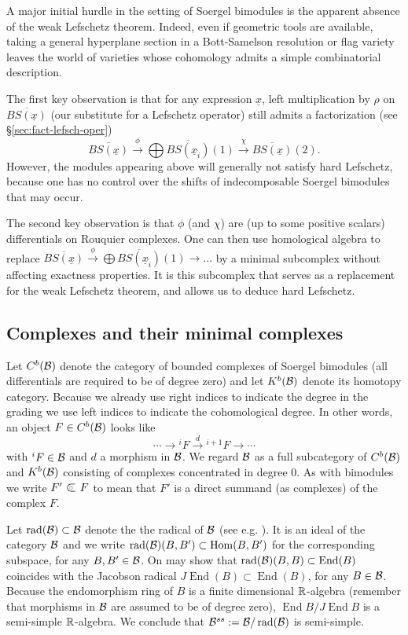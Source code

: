 \documentclass[11pt]{amsart}
\numberwithin{equation}{section}
\def\BS{{\EuScript B}}
\def\ov{\overline}
\def\un{\underline}
\def\to{\rightarrow}
\def\longto{\longrightarrow}
\def\summand{
\mathbin{\tikz [baseline=-3pt]
{
\clip (-0.2,-0.15) rectangle (0.2,0.15);
\node[scale=1.2] at (0,0) {$\subset$}; \node[scale=0.5] at
  (0,0) {$\oplus$}; }}
}
\DeclareMathOperator{\End}{End} %
\DeclareMathOperator{\rad}{rad}
\theoremstyle{definition}
\theoremstyle{remark}
\begin{document}
{A major initial hurdle in the setting of Soergel bimodules is the
apparent absence of the weak Lefschetz theorem. Indeed, even if geometric tools are available, taking a general
hyperplane section in a Bott-Samelson resolution or flag variety leaves the world of
varieties whose cohomology admits a simple combinatorial description.

The first key observation is that for any expression $\un{x}$,
left multiplication by $\rho$ on $\ov{BS(\un{x})}$ (our substitute for a Lefschetz operator) still admits a factorization (see \S\ref{sec:fact-lefsch-oper}) \[ \ov{BS(\un{x})}
\stackrel{\phi}{\longto} \bigoplus \ov{BS(\un{x}_{\hat{i}})}(1) \stackrel{\chi}{\longto} \ov{BS(\un{x})}(2). \] However, the modules appearing above will generally not satisfy hard
Lefschetz, because one has no control over the shifts of indecomposable Soergel bimodules that may occur.

The second key observation is that $\phi$ (and $\chi$) are (up to some positive scalars) differentials on Rouquier complexes. One can then use homological algebra to replace
$\ov{BS(\un{x})} \stackrel{\phi}{\longto} \bigoplus
\ov{BS(\un{x}_{\hat{i}})}(1) \to \dots$ by a minimal subcomplex without affecting exactness properties. It is this subcomplex that serves as a
replacement for the weak Lefschetz theorem, and allows us to deduce hard Lefschetz.

\subsection{Complexes and their minimal complexes} \label{sec:minimal complexes}
Let $C^b({\mathcal{B}})$
denote the category of bounded complexes of Soergel bimodules (all differentials are required to be of degree zero) and let
$K^b({\mathcal{B}})$ denote its homotopy category. Because we already use right
indices to indicate the degree in the grading we use left indices to
indicate the cohomological degree. In other words, an object $F \in
C^b({\mathcal{B}})$ looks like
\[
\cdots \to {}^iF \stackrel{d}{\longto} {}^{i+1}F \to \cdots
\]
with ${}^iF \in {\mathcal{B}}$ and $d$ a morphism in ${\mathcal{B}}$. We regard ${\mathcal{B}}$ as a full subcategory
of $C^b({\mathcal{B}})$ and $K^b({\mathcal{B}})$ consisting of complexes concentrated in
degree 0. As with bimodules we write $F' \summand F$ to mean that $F'$
is a direct summand (as complexes) of the complex $F$.

Let $\rad(\BC) \subset\BC$ denote the the radical of ${\mathcal{B}}$ (see e.g.
\cite[\S1.8]{Kr}). It is an ideal of the category ${\mathcal{B}}$ and we write
$\rad(\BC)(B, B') \subset \Hom(B,B')$ for the corresponding subspace,
for any $B, B' \in {\mathcal{B}}$. On may
show \cite[Proposition 1.8.1]{Kr} that $\rad(\BC)(B,B)
\subset \End(B)$ coincides with the Jacobson radical
$J \End(B) \subset \End(B)$, for any $B \in {\mathcal{B}}$.
Because the endomorphism ring of $B$ is a finite
dimensional ${\mathbb{R}}$-algebra (remember that morphisms in ${\mathcal{B}}$ are
assumed to be of degree zero), $\End B / J \End B$ is a semi-simple
${\mathbb{R}}$-algebra. We conclude that $\BC^{ss}
:= \BC/\rad(\BC)$ is semi-simple.

}
\end{document}
